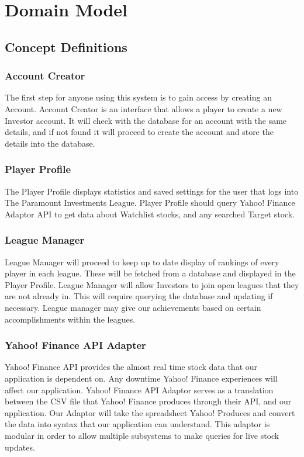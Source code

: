 \chapter{Domain Model}


\section{Concept Definitions}

\subsection{Account Creator}
The first step for anyone using this system is to gain access by creating an Account.
Account Creator is an interface that allows a player to create a new Investor account.
It will check with the database for an account with the same details, and if not found
it will proceed to create the account and store the details into the database.\\

\subsection{Player Profile}
The Player Profile displays statistics and saved settings for the user that logs
into The Paramount Investments League. Player Profile should query Yahoo! Finance
Adaptor API to get data about Watchlist stocks, and any searched Target stock.\\

\subsection{League Manager}
League Manager will proceed to keep up to date display of rankings of every
player in each league. These will be fetched from a database and displayed
in the Player Profile. League Manager will allow Investors to join open
leagues that they are not already in. This will require querying the
database and updating if necessary. League manager may give our achievements
based on certain accomplishments within the leagues.\\

\subsection{Yahoo! Finance API Adapter}
Yahoo! Finance API provides the almost real time stock data that our
application is dependent on. Any downtime Yahoo! Finance experiences
will affect our application. Yahoo! Finance API Adaptor serves as a
translation between the CSV file that Yahoo! Finance produces through
their API, and our application. Our Adaptor will take the spreadsheet
Yahoo! Produces and convert the data into syntax that our application
can understand. This adaptor is modular in order to allow multiple
subsystems to make queries for live stock updates.\\

